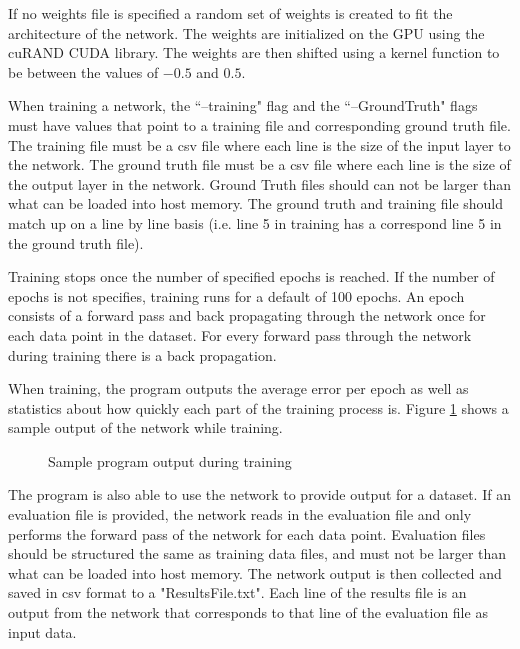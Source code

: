 \documentclass[jair, twoside,11pt,theapa]{article}
\begin{document}
If no weights file is specified a random set of weights is created to fit the architecture of the network. 
The weights are initialized on the GPU using the cuRAND CUDA library. 
The weights are then shifted using a kernel function to be between the values of $-0.5$ and $0.5$.

When training a network, the ``--training" flag and the ``--GroundTruth" flags must have values that point to a training file and corresponding ground truth file. 
The training file must be a csv file where each line is the size of the input layer to the network. 
The ground truth file must be a csv file where each line is the size of the output layer in the network.
Ground Truth files should can not be larger than what can be loaded into host memory. 
The ground truth and training file should match up on a line by line basis (i.e. line 5 in training has a correspond line 5 in the ground truth file).

Training stops once the number of specified epochs is reached. 
If the number of epochs is not specifies, training runs for a default of 100 epochs. 
An epoch consists of a forward pass and back propagating through the network once for each data point in the dataset. 
For every forward pass through the network during training there is a back propagation. 

When training, the program outputs the average error per epoch as well as statistics about how quickly each part of the training process is. 
Figure \ref{TrainingOutput} shows a sample output of the network while training. 

\begin{figure}[h]
    \centering
    \caption{Sample program output during training}
    \label{TrainingOutput}
\end{figure}

The program is also able to use the network to provide output for a dataset. 
If an evaluation file is provided, the network reads in the evaluation file and only performs the forward pass of the network for each data point. 
Evaluation files should be structured the same as training data files, and must not be larger than what can be loaded into host memory. 
The network output is then collected and saved in csv format to a "ResultsFile.txt". 
Each line of the results file is an output from the network that corresponds to that line of the evaluation file as input data. 
\end{document}
